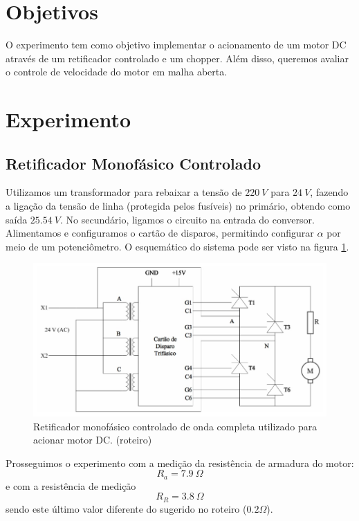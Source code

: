 \documentclass{article}
\begin{document}


\onehalfspacing
\section{Objetivos}
	O experimento tem como objetivo implementar o acionamento de um motor DC através de um retificador controlado e um chopper. Além disso, queremos avaliar o controle de velocidade do motor em malha aberta.
	 
\section{Experimento}
\subsection{Retificador Monofásico Controlado}
Utilizamos um transformador para rebaixar a tensão de $220\ V$ para $24\ V$, fazendo a ligação da tensão de linha (protegida pelos fusíveis) no primário, obtendo como saída $25.54\ V$. No secundário, ligamos o circuito na entrada do conversor. Alimentamos e configuramos o cartão de disparos, permitindo configurar $\alpha$ por meio de um potenciômetro. O esquemático do sistema pode ser visto na figura \ref{fig:retesq}.

\begin{figure}[H]
	\centering
	\includegraphics[width=\linewidth]{Dados/Retificador/esq}
	\caption{Retificador monofásico controlado de onda completa utilizado para acionar motor DC. (roteiro)}
	\label{fig:retesq}
\end{figure}

Prosseguimos o experimento com a medição da resistência de armadura do motor:
\begin{equation}
R_a=7.9\ \Omega
\end{equation}
e com a resistência de medição 
\begin{equation}
R_R=3.8\ \Omega
\end{equation}
sendo este último valor diferente do sugerido no roteiro ($0.2\Omega$).
\end{document}
